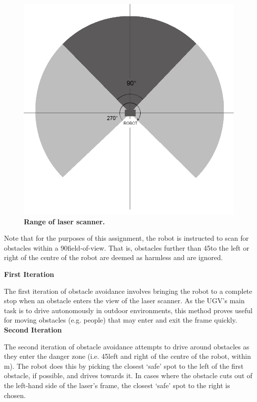 \documentclass[titlepage,12pt,a4paper]{article}
\begin{document}
\begin{figure}[h]
	\centering
	\includegraphics[scale=0.34]{figures/laser.png}
	\caption{\textbf{Range of laser scanner.}}
\end{figure}

Note that for the purposes of this assignment, the robot is instructed to scan for obstacles within a 90\degree field-of-view. That is, obstacles further than 45\degree to the left or right of the centre of the robot are deemed as harmless and are ignored.

\textbf{First Iteration}

The first iteration of obstacle avoidance involves bringing the robot to a complete stop when an obstacle enters the view of the laser scanner. As the UGV's main task is to drive autonomously in outdoor environments, this method proves useful for moving obstacles (e.g. people) that may enter and exit the frame quickly. \\

\textbf{Second Iteration}

The second iteration of obstacle avoidance attempts to drive around obstacles as they enter the danger zone (i.e. 45\degree left and right of the centre of the robot, within \unit[2]{m}). The robot does this by picking the closest `safe' spot to the left of the first obstacle, if possible, and drives towards it. In cases where the obstacle cuts out of the left-hand side of the laser's frame, the closest `safe' spot to the right is chosen. 
\end{document}
